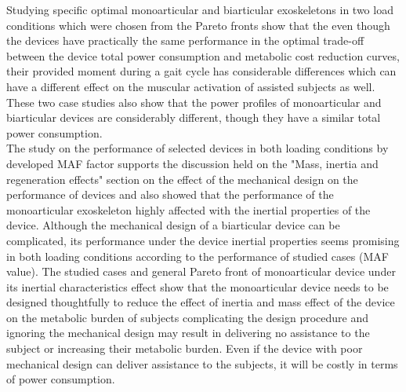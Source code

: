 \documentclass[10pt,letterpaper]{article}
\begin{document}
Studying specific optimal monoarticular and biarticular exoskeletons in two load conditions which were chosen from the Pareto fronts show that the even though the devices have practically the same performance in the optimal trade-off between the device total power consumption and metabolic cost reduction curves, their provided moment during a gait cycle has considerable differences which can have a different effect on the muscular activation of assisted subjects as well. These two case studies also show that the power profiles of monoarticular and biarticular devices are considerably different, though they have a similar total power consumption.\\
The study on the performance of selected devices in both loading conditions by developed MAF factor supports the discussion held on the "Mass, inertia and regeneration effects" section on the effect of the mechanical design on the performance of devices and also showed that the performance of the monoarticular exoskeleton highly affected with the inertial properties of the device. Although the mechanical design of a biarticular device can be complicated, its performance under the device inertial properties seems promising in both loading conditions according to the performance of studied cases (MAF value). The studied cases and general Pareto front of monoarticular device under its inertial characteristics effect show that the monoarticular device needs to be designed thoughtfully to reduce the effect of inertia and mass effect of the device on the metabolic burden of subjects complicating the design procedure and ignoring the mechanical design may result in delivering no assistance to the subject or increasing their metabolic burden. Even if the device with poor mechanical design can deliver assistance to the subjects, it will be costly in terms of power consumption. 
\end{document}
